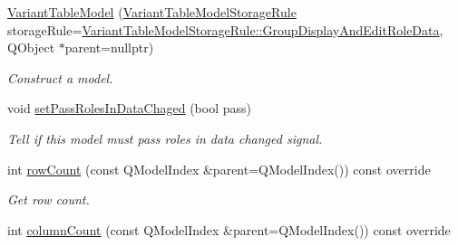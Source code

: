 \begin{DoxyCompactItemize}
\item 
\hyperlink{class_mdt_1_1_item_model_1_1_variant_table_model_a6a3955e35972ecdf682b233138e7e21c}{Variant\+Table\+Model} (\hyperlink{namespace_mdt_1_1_item_model_ad48e47e80d7e13b5b951346649748190}{Variant\+Table\+Model\+Storage\+Rule} storage\+Rule=\hyperlink{namespace_mdt_1_1_item_model_ad48e47e80d7e13b5b951346649748190ae88ac0701e175a5eb535dad1703db2a1}{Variant\+Table\+Model\+Storage\+Rule\+::\+Group\+Display\+And\+Edit\+Role\+Data}, Q\+Object $\ast$parent=nullptr)\hypertarget{class_mdt_1_1_item_model_1_1_variant_table_model_a6a3955e35972ecdf682b233138e7e21c}{}\label{class_mdt_1_1_item_model_1_1_variant_table_model_a6a3955e35972ecdf682b233138e7e21c}

\begin{DoxyCompactList}\small\item\em Construct a model. \end{DoxyCompactList}\item 
void \hyperlink{class_mdt_1_1_item_model_1_1_variant_table_model_a5beb3844e52deb88eba0f50075ab942e}{set\+Pass\+Roles\+In\+Data\+Chaged} (bool pass)
\begin{DoxyCompactList}\small\item\em Tell if this model must pass roles in data changed signal. \end{DoxyCompactList}\item 
int \hyperlink{class_mdt_1_1_item_model_1_1_variant_table_model_a76330ef86b94573e02a61946e50e99a9}{row\+Count} (const Q\+Model\+Index \&parent=Q\+Model\+Index()) const override\hypertarget{class_mdt_1_1_item_model_1_1_variant_table_model_a76330ef86b94573e02a61946e50e99a9}{}\label{class_mdt_1_1_item_model_1_1_variant_table_model_a76330ef86b94573e02a61946e50e99a9}

\begin{DoxyCompactList}\small\item\em Get row count. \end{DoxyCompactList}\item 
int \hyperlink{class_mdt_1_1_item_model_1_1_variant_table_model_acd4d14fc0041cdd9e509987e49dcf5b3}{column\+Count} (const Q\+Model\+Index \&parent=Q\+Model\+Index()) const override\hypertarget{class_mdt_1_1_item_model_1_1_variant_table_model_acd4d14fc0041cdd9e509987e49dcf5b3}{}\label{class_mdt_1_1_item_model_1_1_variant_table_model_acd4d14fc0041cdd9e509987e49dcf5b3}


\end{DoxyCompactItemize}
